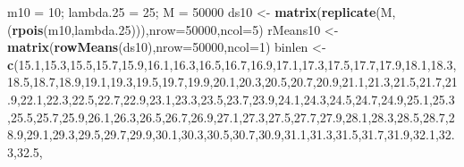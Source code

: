 \documentclass[
]{article}
\newenvironment{Shaded}{\begin{snugshade}}{\end{snugshade}}
\newcommand{\DataTypeTok}[1]{\textcolor[rgb]{0.13,0.29,0.53}{#1}}
\newcommand{\DecValTok}[1]{\textcolor[rgb]{0.00,0.00,0.81}{#1}}
\newcommand{\FloatTok}[1]{\textcolor[rgb]{0.00,0.00,0.81}{#1}}
\newcommand{\KeywordTok}[1]{\textcolor[rgb]{0.13,0.29,0.53}{\textbf{#1}}}
\newcommand{\NormalTok}[1]{#1}
\newcommand{\StringTok}[1]{\textcolor[rgb]{0.31,0.60,0.02}{#1}}
\begin{document}
\begin{Shaded}
\begin{Highlighting}[]
\NormalTok{m10 =}\StringTok{ }\DecValTok{10}\NormalTok{; lambda}\FloatTok{.25}\NormalTok{ =}\StringTok{ }\DecValTok{25}\NormalTok{; M =}\StringTok{ }\DecValTok{50000}
\NormalTok{ds10 <-}\StringTok{ }\KeywordTok{matrix}\NormalTok{(}\KeywordTok{replicate}\NormalTok{(M,(}\KeywordTok{rpois}\NormalTok{(m10,lambda}\FloatTok{.25}\NormalTok{))),}\DataTypeTok{nrow=}\DecValTok{50000}\NormalTok{,}\DataTypeTok{ncol=}\DecValTok{5}\NormalTok{)}
\NormalTok{rMeans10 <-}\StringTok{ }\KeywordTok{matrix}\NormalTok{(}\KeywordTok{rowMeans}\NormalTok{(ds10),}\DataTypeTok{nrow=}\DecValTok{50000}\NormalTok{,}\DataTypeTok{ncol=}\DecValTok{1}\NormalTok{)}
\NormalTok{binlen <-}\StringTok{ }\KeywordTok{c}\NormalTok{(}\FloatTok{15.1}\NormalTok{,}\FloatTok{15.3}\NormalTok{,}\FloatTok{15.5}\NormalTok{,}\FloatTok{15.7}\NormalTok{,}\FloatTok{15.9}\NormalTok{,}\FloatTok{16.1}\NormalTok{,}\FloatTok{16.3}\NormalTok{,}\FloatTok{16.5}\NormalTok{,}\FloatTok{16.7}\NormalTok{,}\FloatTok{16.9}\NormalTok{,}\FloatTok{17.1}\NormalTok{,}\FloatTok{17.3}\NormalTok{,}\FloatTok{17.5}\NormalTok{,}\FloatTok{17.7}\NormalTok{,}\FloatTok{17.9}\NormalTok{,}\FloatTok{18.1}\NormalTok{,}\FloatTok{18.3}\NormalTok{,}\FloatTok{18.5}\NormalTok{,}\FloatTok{18.7}\NormalTok{,}\FloatTok{18.9}\NormalTok{,}\FloatTok{19.1}\NormalTok{,}\FloatTok{19.3}\NormalTok{,}\FloatTok{19.5}\NormalTok{,}\FloatTok{19.7}\NormalTok{,}\FloatTok{19.9}\NormalTok{,}\FloatTok{20.1}\NormalTok{,}\FloatTok{20.3}\NormalTok{,}\FloatTok{20.5}\NormalTok{,}\FloatTok{20.7}\NormalTok{,}\FloatTok{20.9}\NormalTok{,}\FloatTok{21.1}\NormalTok{,}\FloatTok{21.3}\NormalTok{,}\FloatTok{21.5}\NormalTok{,}\FloatTok{21.7}\NormalTok{,}\FloatTok{21.9}\NormalTok{,}\FloatTok{22.1}\NormalTok{,}\FloatTok{22.3}\NormalTok{,}\FloatTok{22.5}\NormalTok{,}\FloatTok{22.7}\NormalTok{,}\FloatTok{22.9}\NormalTok{,}\FloatTok{23.1}\NormalTok{,}\FloatTok{23.3}\NormalTok{,}\FloatTok{23.5}\NormalTok{,}\FloatTok{23.7}\NormalTok{,}\FloatTok{23.9}\NormalTok{,}\FloatTok{24.1}\NormalTok{,}\FloatTok{24.3}\NormalTok{,}\FloatTok{24.5}\NormalTok{,}\FloatTok{24.7}\NormalTok{,}\FloatTok{24.9}\NormalTok{,}\FloatTok{25.1}\NormalTok{,}\FloatTok{25.3}\NormalTok{,}\FloatTok{25.5}\NormalTok{,}\FloatTok{25.7}\NormalTok{,}\FloatTok{25.9}\NormalTok{,}\FloatTok{26.1}\NormalTok{,}\FloatTok{26.3}\NormalTok{,}\FloatTok{26.5}\NormalTok{,}\FloatTok{26.7}\NormalTok{,}\FloatTok{26.9}\NormalTok{,}\FloatTok{27.1}\NormalTok{,}\FloatTok{27.3}\NormalTok{,}\FloatTok{27.5}\NormalTok{,}\FloatTok{27.7}\NormalTok{,}\FloatTok{27.9}\NormalTok{,}\FloatTok{28.1}\NormalTok{,}\FloatTok{28.3}\NormalTok{,}\FloatTok{28.5}\NormalTok{,}\FloatTok{28.7}\NormalTok{,}\FloatTok{28.9}\NormalTok{,}\FloatTok{29.1}\NormalTok{,}\FloatTok{29.3}\NormalTok{,}\FloatTok{29.5}\NormalTok{,}\FloatTok{29.7}\NormalTok{,}\FloatTok{29.9}\NormalTok{,}\FloatTok{30.1}\NormalTok{,}\FloatTok{30.3}\NormalTok{,}\FloatTok{30.5}\NormalTok{,}\FloatTok{30.7}\NormalTok{,}\FloatTok{30.9}\NormalTok{,}\FloatTok{31.1}\NormalTok{,}\FloatTok{31.3}\NormalTok{,}\FloatTok{31.5}\NormalTok{,}\FloatTok{31.7}\NormalTok{,}\FloatTok{31.9}\NormalTok{,}\FloatTok{32.1}\NormalTok{,}\FloatTok{32.3}\NormalTok{,}\FloatTok{32.5}\NormalTok{,}\FloatT
\end{Highlighting}
\end{Shaded}
\end{document}
